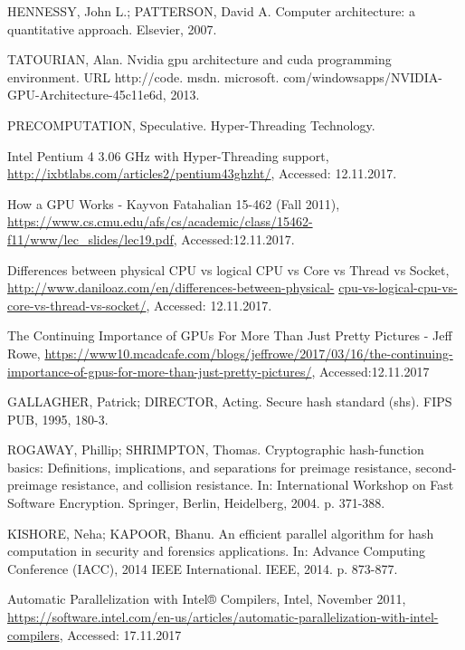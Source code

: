 \documentclass[conference]{IEEEtran}
\begin{document}
\begin{thebibliography}{1}

HENNESSY, John L.; PATTERSON, David A. Computer architecture: a quantitative approach. Elsevier, 2007.

TATOURIAN, Alan. Nvidia gpu architecture and cuda programming environment. URL http://code. msdn. microsoft. com/windowsapps/NVIDIA-GPU-Architecture-45c11e6d, 2013.

PRECOMPUTATION, Speculative. Hyper-Threading Technology.

Intel Pentium 4 3.06 GHz with Hyper-Threading support, \url{http://ixbtlabs.com/articles2/pentium43ghzht/}, Accessed: 12.11.2017.

How a GPU Works - Kayvon Fatahalian 15-462 (Fall 2011), \url{https://www.cs.cmu.edu/afs/cs/academic/class/15462-f11/www/lec_slides/lec19.pdf}, Accessed:12.11.2017.

Differences between physical CPU vs logical CPU vs Core vs Thread vs Socket, \url{http://www.daniloaz.com/en/differences-between-physical-} \url{cpu-vs-logical-cpu-vs-core-vs-thread-vs-socket/}, Accessed: 12.11.2017.

The Continuing Importance of GPUs For More Than Just Pretty Pictures - Jeff Rowe, \url{https://www10.mcadcafe.com/blogs/jeffrowe/2017/03/16/the-continuing-importance-of-gpus-for-more-than-just-pretty-pictures/}, Accessed:12.11.2017

GALLAGHER, Patrick; DIRECTOR, Acting. Secure hash standard (shs). FIPS PUB, 1995, 180-3.

ROGAWAY, Phillip; SHRIMPTON, Thomas. Cryptographic hash-function basics: Definitions, implications, and separations for preimage resistance, second-preimage resistance, and collision resistance. In: International Workshop on Fast Software Encryption. Springer, Berlin, Heidelberg, 2004. p. 371-388.

KISHORE, Neha; KAPOOR, Bhanu. An efficient parallel algorithm for hash computation in security and forensics applications. In: Advance Computing Conference (IACC), 2014 IEEE International. IEEE, 2014. p. 873-877.

Automatic Parallelization with Intel® Compilers, Intel, November 2011, \url{https://software.intel.com/en-us/articles/automatic-parallelization-with-intel-compilers}, Accessed: 17.11.2017

\end{thebibliography}
\end{document}
